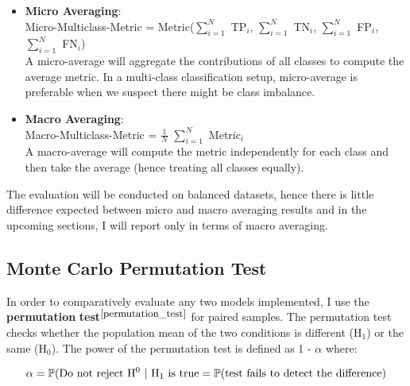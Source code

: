 \begin{itemize}
  \item \textbf{Micro Averaging}: \\
        Micro-Multiclass-Metric = Metric($\sum_{i=1}^{N}$ TP$_i$, $\sum_{i=1}^{N}$ TN$_i$, $\sum_{i=1}^{N}$ FP$_i$, $\sum_{i=1}^{N}$ FN$_i$) \\
        A micro-average will aggregate the contributions of all classes to compute the average metric. In a multi-class classification setup, micro-average is preferable when we suspect there might be class imbalance.

  \item \textbf{Macro Averaging}: \\
        Macro-Multiclass-Metric = $\tfrac{1}{N}$ $\sum_{i=1}^{N}$ Metric$_i$ \\
        A macro-average will compute the metric independently for each class and then take the average (hence treating all classes equally).
\end{itemize}

The evaluation will be conducted on balanced datasets, hence there is little difference expected between micro and macro averaging results and in the upcoming sections, I will report only in terms of macro averaging. 


\subsection{Monte Carlo Permutation Test}

In order to comparatively evaluate any two models implemented, I use the \textbf{permutation} \textbf{test}$^{\small \cite{permutation_test}}$ for paired samples. The permutation test checks whether the population mean of the two conditions is different (H$_1$) or the same (H$_0$). The power of the permutation test is defined as 1 - $\alpha$ where:

\begin{equation}
  \centering
  \alpha = \mathbb{P}(\text{Do not reject H$^0$ | H$_1$ is true} = \mathbb{P}(\text{test fails to detect the difference}) \newline
\end{equation}

